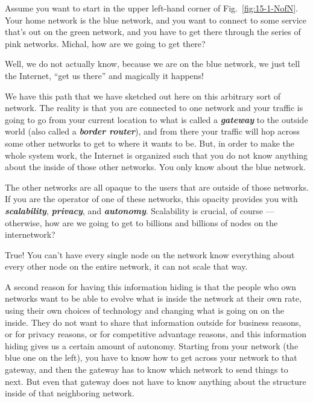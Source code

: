 Assume you want to start in the upper left-hand corner of Fig.~\ref{fig:15-1-NofN}. Your home network is the blue network, and you want to connect to some service that's out on the green network, and you have to get there through the series of pink networks. Michal, how are we going to get there?

\mmm Well, we do not actually know, because we are on the blue network, we just tell the Internet, ``get us there'' and magically it happens!

\rrr We have this path that we have sketched out here on this arbitrary sort of network. The reality is that you are connected to one network and your traffic is going to go from your current location to what is called a \textbf{\emph{gateway}} to the outside world (also called a \textbf{\emph{border router}}), and from there your traffic will hop across some other networks to get to where it wants to be. But, in order to make the whole system work, the Internet is organized such that you do not know anything about the inside of those other networks. You only know about the blue network.

The other networks are all opaque to the users that are outside of those networks. If you are the operator of one of these networks, this opacity provides you with \textbf{\emph{scalability}}, \textbf{\emph{privacy}}, and \textbf{\emph{autonomy}}. Scalability is crucial, of course --- otherwise, how are we going to get to billions and billions of nodes on the internetwork?

\mmm True! You can't have every single node on the network know everything about every other node on the entire network, it can not scale that way.

\rrr A second reason for having this information hiding is that the people who own networks want to be able to evolve what is inside the network at their own rate, using their own choices of technology and changing what is going on on the inside. They do not want to share that information outside for business reasons, or for privacy reasons, or for competitive advantage reasons, and this information hiding gives us a certain amount of autonomy. Starting from your network (the blue one on the left), you have to know how to get across your network to that gateway, and then the gateway has to know which network to send things to next. But even that gateway does not have to know anything about the structure inside of that neighboring network.

